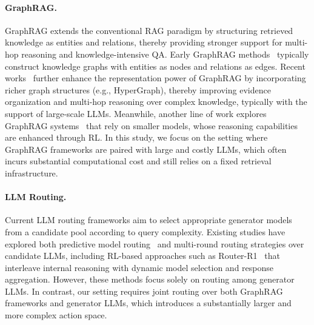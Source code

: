 \paragraph{GraphRAG.}
GraphRAG extends the conventional RAG paradigm by structuring retrieved knowledge as entities and relations, thereby providing stronger support for multi-hop reasoning and knowledge-intensive QA. Early GraphRAG methods~\cite{GraphRAG,RAPTOR} typically construct knowledge graphs with entities as nodes and relations as edges. Recent works~\cite{LightRAG,LinearRAG,HippoRAG,HippoRAG2} further enhance the representation power of GraphRAG by incorporating richer graph structures (e.g., HyperGraph), thereby improving evidence organization and multi-hop reasoning over complex knowledge, typically with the support of large-scale LLMs. Meanwhile, another line of work explores GraphRAG systems~\cite{Graph-R1, GraphSearch, GraphRAG-R1} that rely on smaller models, whose reasoning capabilities are enhanced through RL. In this study, we focus on the setting where GraphRAG frameworks are paired with large and costly LLMs, which often incurs substantial computational cost and still relies on a fixed retrieval infrastructure.

\paragraph{LLM Routing.}
Current LLM routing frameworks aim to select appropriate generator models from a candidate pool according to query complexity. Existing studies have explored both predictive model routing~\cite{KNNRouter, graphrouter} and multi-round routing strategies over candidate LLMs, including RL-based approaches such as Router-R1~\cite{Router-R1} that interleave internal reasoning with dynamic model selection and response aggregation. However, these methods focus solely on routing among generator LLMs. In contrast, our setting requires joint routing over both GraphRAG frameworks and generator LLMs, which introduces a substantially larger and more complex action space.


